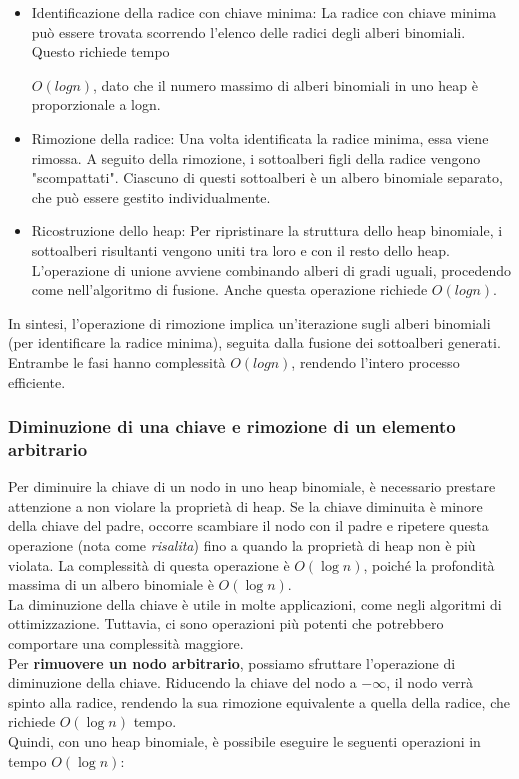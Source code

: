 \documentclass[a4paper]{article}
\begin{document}
\begin{itemize}
  \item Identificazione della radice con chiave minima:
La radice con chiave minima può essere trovata scorrendo l'elenco delle radici degli alberi binomiali. Questo richiede tempo 

$O(logn)$, dato che il numero massimo di alberi binomiali in uno heap è proporzionale a 
logn.

\item Rimozione della radice:
Una volta identificata la radice minima, essa viene rimossa. A seguito della rimozione, i sottoalberi figli della radice vengono "scompattati". Ciascuno di questi sottoalberi è un albero binomiale separato, che può essere gestito individualmente.

\item Ricostruzione dello heap:
Per ripristinare la struttura dello heap binomiale, i sottoalberi risultanti vengono uniti tra loro e con il resto dello heap. L'operazione di unione avviene combinando alberi di gradi uguali, procedendo come nell'algoritmo di fusione. Anche questa operazione richiede 
$O(logn)$.

\end{itemize}
In sintesi, l'operazione di rimozione implica un'iterazione sugli alberi binomiali (per identificare la radice minima), seguita dalla fusione dei sottoalberi generati. Entrambe le fasi hanno complessità 
$O(logn)$, rendendo l'intero processo efficiente.



\subsubsection{Diminuzione di una chiave e rimozione di un elemento arbitrario}

Per diminuire la chiave di un nodo in uno heap binomiale, è necessario prestare attenzione a non violare la proprietà di heap. Se la chiave diminuita è minore della chiave del padre, occorre scambiare il nodo con il padre e ripetere questa operazione (nota come \textit{risalita}) fino a quando la proprietà di heap non è più violata. La complessità di questa operazione è \( O(\log n) \), poiché la profondità massima di un albero binomiale è \( O(\log n) \).
\\
La diminuzione della chiave è utile in molte applicazioni, come negli algoritmi di ottimizzazione. Tuttavia, ci sono operazioni più potenti che potrebbero comportare una complessità maggiore.
\\
Per \textbf{rimuovere un nodo arbitrario}, possiamo sfruttare l'operazione di diminuzione della chiave. Riducendo la chiave del nodo a \(-\infty\), il nodo verrà spinto alla radice, rendendo la sua rimozione equivalente a quella della radice, che richiede \( O(\log n) \) tempo.
\\
Quindi, con uno heap binomiale, è possibile eseguire le seguenti operazioni in tempo \( O(\log n) \):
\end{document}
